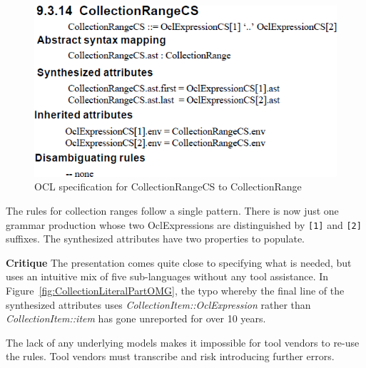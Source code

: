 \documentclass{llncs}
\begin{document}
\begin{figure}[htbp]
\centering
\includegraphics[scale=0.45]{images/CollectionRangeOMG.png}
\caption{OCL specification for CollectionRangeCS to CollectionRange}
\label{fig:CollectionRangeOMG}
\end{figure}
The rules for collection ranges follow a single pattern. There is now just one grammar production whose two OclExpressions are distinguished by \verb$[1]$ and \verb$[2]$ suffixes. The synthesized attributes have two properties to populate.

\textbf{Critique} The presentation comes quite close to specifying what is needed, but uses an intuitive mix of five sub-languages without any tool assistance. In Figure~\ref{fig:CollectionLiteralPartOMG}, the typo whereby the final line of the synthesized attributes uses \emph{CollectionItem::OclExpression} rather than \emph{CollectionItem::item} has gone unreported for over 10 years.

The lack of any underlying models makes it impossible for tool vendors to re-use the rules. Tool vendors must transcribe and risk introducing further errors.

\end{document}
